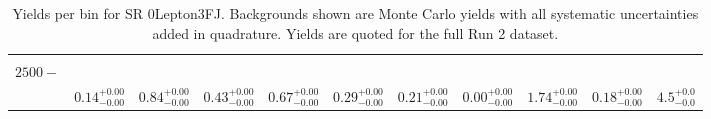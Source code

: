 \begin{table}[!htbp]
\begin{tabular}{c|c|c|c|c|c|c|c|c|c||c}
    \hline
    \pbox{20cm}{ ~ \\$2500-$\\ } & $0.14  ^{+0.00}_{-0.00}$ & $0.84  ^{+0.00}_{-0.00}$ & $0.43  ^{+0.00}_{-0.00}$ & $0.67  ^{+0.00}_{-0.00}$ & $0.29  ^{+0.00}_{-0.00}$ & $0.21  ^{+0.00}_{-0.00}$ & $0.00  ^{+0.00}_{-0.00}$ & $1.74  ^{+0.00}_{-0.00}$ & $0.18  ^{+0.00}_{-0.00}$ & $4.5  ^{+0.0}_{-0.0}$\\
\end{tabular}
    \caption{Yields per bin for SR 0Lepton3FJ. Backgrounds shown are Monte Carlo yields with all systematic uncertainties added in quadrature. Yields are quoted for the full Run 2 dataset.}
    \label{tab:0Lepton3FJ$binssyst}
\end{table}
